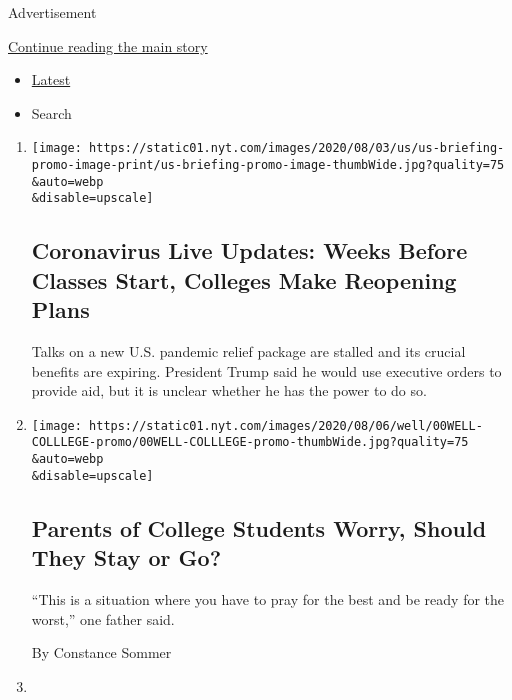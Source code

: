 Advertisement

\protect\hyperlink{after-mid2}{Continue reading the main story}

\begin{itemize}
\tightlist
\item
  \protect\hyperlink{stream-panel}{Latest}
\item
  Search
\end{itemize}

\begin{enumerate}
\def\labelenumi{\arabic{enumi}.}
\item
  \href{/2020/08/08/world/coronavirus-updates.html}{}

  \texttt{[image: https://static01.nyt.com/images/2020/08/03/us/us-briefing-promo-image-print/us-briefing-promo-image-thumbWide.jpg?quality=75\\\&auto=webp\\\&disable=upscale]}

  \hypertarget{coronavirus-live-updates-weeks-before-classes-start-colleges-make-reopening-plans}{%
  \subsection{Coronavirus Live Updates: Weeks Before Classes Start,
  Colleges Make Reopening
  Plans}\label{coronavirus-live-updates-weeks-before-classes-start-colleges-make-reopening-plans}}

  Talks on a new U.S. pandemic relief package are stalled and its
  crucial benefits are expiring. President Trump said he would use
  executive orders to provide aid, but it is unclear whether he has the
  power to do so.
\item
  \href{/2020/08/07/well/family/college-students-coronavirus-parents-back-to-school.html}{}

  \texttt{[image: https://static01.nyt.com/images/2020/08/06/well/00WELL-COLLLEGE-promo/00WELL-COLLLEGE-promo-thumbWide.jpg?quality=75\\\&auto=webp\\\&disable=upscale]}

  \hypertarget{parents-of-college-students-worry-should-they-stay-or-go}{%
  \subsection{Parents of College Students Worry, Should They Stay or
  Go?}\label{parents-of-college-students-worry-should-they-stay-or-go}}

  ``This is a situation where you have to pray for the best and be ready
  for the worst,'' one father said.

  By Constance Sommer
\item
  \href{/2020/08/07/us/portsmouth-nh-newsletter-poems.html}{}


\end{enumerate}
